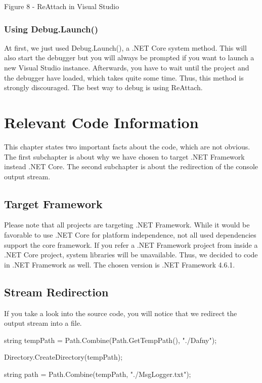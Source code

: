 \documentclass[]{book}
\begin{document}
Figure 8 - ReAttach in Visual Studio

\subsection{Using Debug.Launch()}\label{using-debug.launch}

At first, we just used Debug.Launch(), a .NET Core system method. This will also start the debugger but you will always be prompted if you want to launch a new Visual Studio instance. Afterwards, you have to wait until the project and the debugger have loaded, which takes quite some time. Thus, this method is strongly discouraged. The best way to debug is using ReAttach.

\chapter{Relevant Code Information}\label{relevant-code-information}

This chapter states two important facts about the code, which are not obvious. The first subchapter is about why we have chosen to target .NET Framework instead .NET Core. The second subchapter is about the redirection of the console output stream.

\section{Target Framework}\label{target-framework}

Please note that all projects are targeting .NET Framework. While it would be favorable to use .NET Core for platform independence, not all used dependencies support the core framework. If you refer a .NET Framework project from inside a .NET Core project, system libraries will be unavailable. Thus, we decided to code in .NET Framework as well. The chosen version is .NET Framework 4.6.1.

\section{Stream Redirection}\label{stream-redirection}

If you take a look into the source code, you will notice that we redirect the output stream into a file.

string tempPath = Path.Combine(Path.GetTempPath(), "./Dafny");

Directory.CreateDirectory(tempPath);

string path = Path.Combine(tempPath, "./MsgLogger.txt");
\end{document}
